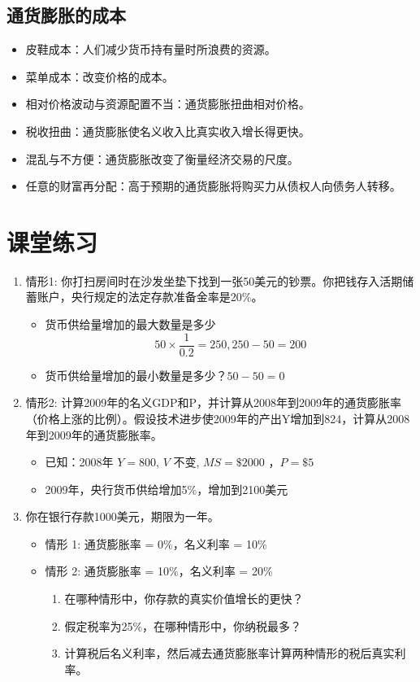 \documentclass[12pt, a4paper]{article}
\begin{document}
\subsection{通货膨胀的成本}
\begin{itemize}
    \item 皮鞋成本：人们减少货币持有量时所浪费的资源。
    \item 菜单成本：改变价格的成本。
    \item 相对价格波动与资源配置不当：通货膨胀扭曲相对价格。
    \item 税收扭曲：通货膨胀使名义收入比真实收入增长得更快。
    \item 混乱与不方便：通货膨胀改变了衡量经济交易的尺度。
    \item 任意的财富再分配：高于预期的通货膨胀将购买力从债权人向债务人转移。
\end{itemize}

\section{课堂练习}
\begin{enumerate}
    \item 情形1: 你打扫房间时在沙发坐垫下找到一张50美元的钞票。你把钱存入活期储蓄账户，央行规定的法定存款准备金率是20\%。
    \begin{itemize}
        \item 货币供给量增加的最大数量是多少 \[ 50 \times \frac{1}{0.2} = 250, 250 - 50 = 200 \]
        \item 货币供给量增加的最小数量是多少？\( 50 - 50 = 0 \)
    \end{itemize}

    \item 情形2: 计算2009年的名义GDP和P，并计算从2008年到2009年的通货膨胀率（价格上涨的比例）。假设技术进步使2009年的产出Y增加到824，计算从2008年到2009年的通货膨胀率。
    \begin{itemize}
        \item 已知：2008年 \( Y = 800 \), \( V \) 不变, \( MS = \$2000 \) ，\( P = \$5 \)
        \item 2009年，央行货币供给增加5\%，增加到2100美元
    \end{itemize}

    \item 你在银行存款1000美元，期限为一年。
    \begin{itemize}
        \item 情形 1:  通货膨胀率 = 0\%，名义利率 = 10\%
        \item 情形 2:  通货膨胀率 = 10\%，名义利率 = 20\%
        \begin{enumerate}
            \item 在哪种情形中，你存款的真实价值增长的更快？
            \item 假定税率为25\%，在哪种情形中，你纳税最多？
            \item 计算税后名义利率，然后减去通货膨胀率计算两种情形的税后真实利率。
        \end{enumerate}
    \end{itemize}
\end{enumerate}
\end{document}

